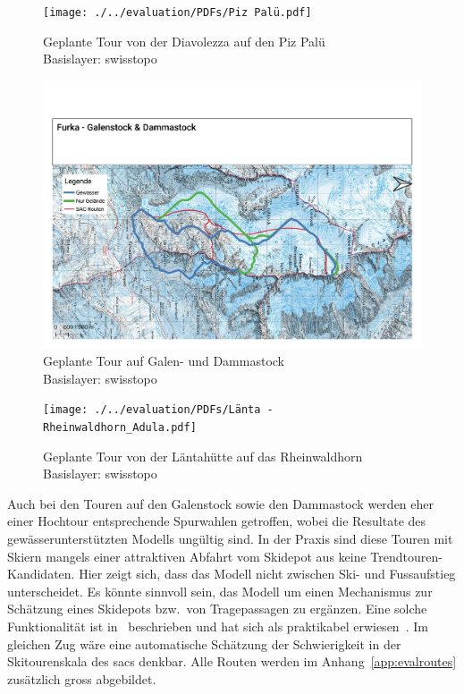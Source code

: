 \begin{figure}[ht]
  \centering
  \texttt{[image: ./../evaluation/PDFs/Piz Palü.pdf]}
  \caption{Geplante Tour von der Diavolezza auf den Piz Palü\\Basislayer: swisstopo}\label{fig:pizpalu}
\end{figure}
\begin{figure}[ht]
  \centering
  \includegraphics[page=1,width=.9\linewidth]{./../evaluation/PDFs/Furka - Galenstock & Dammastock.pdf}
  \caption{Geplante Tour auf Galen- und Dammastock\\Basislayer: swisstopo}\label{fig:pizpalu}
\end{figure}
\begin{figure}[ht]
  \centering
  \texttt{[image: ./../evaluation/PDFs/Länta - Rheinwaldhorn\_Adula.pdf]}
  \caption{Geplante Tour von der Läntahütte auf das Rheinwaldhorn\\Basislayer: swisstopo}\label{fig:pizpalu}
\end{figure}

Auch bei den Touren auf den Galenstock sowie den Dammastock werden eher einer Hochtour entsprechende Spurwahlen getroffen, wobei die Resultate des gewässerunterstützten Modells ungültig sind. 
In der Praxis sind diese Touren mit Skiern mangels einer attraktiven Abfahrt vom Skidepot aus keine Trendtouren-Kandidaten. Hier zeigt sich, dass das Modell nicht zwischen Ski- und Fussaufstieg unterscheidet. Es könnte sinnvoll sein, das Modell um einen Mechanismus zur Schätzung eines Skidepots bzw.\ von Tragepassagen zu ergänzen. Eine solche Funktionalität ist in\ \citeauthor{footandcautionsection} beschrieben und hat sich als praktikabel erwiesen~\cite{footandcautionsection}. Im gleichen Zug wäre eine automatische Schätzung der Schwierigkeit in der Skitourenskala des \acrshort{sac}s denkbar. 
Alle Routen werden im Anhang\ \ref{app:evalroutes} zusätzlich gross abgebildet.


